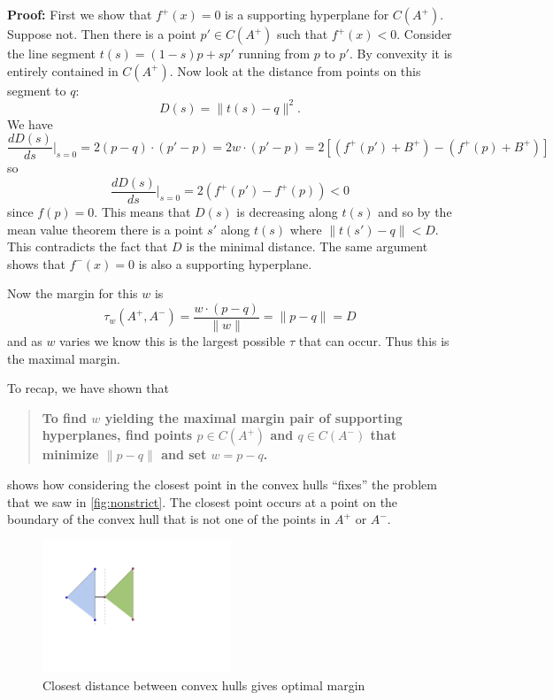 \documentclass[
]{article}
\begin{document}
\textbf{Proof:} First we show that \(f^{+}(x)=0\) is a supporting
hyperplane for \(C(A^{+})\). Suppose not. Then there is a point
\(p'\in C(A^{+})\) such that \(f^{+}(x)<0\). Consider the line segment
\(t(s) = (1-s)p+sp'\) running from \(p\) to \(p'\). By convexity it is
entirely contained in \(C(A^{+})\). Now look at the distance from points
on this segment to \(q\): \[
D(s)=\|t(s)-q\|^2.
\] We have \[
\frac{dD(s)}{ds}|_{s=0} = 2(p-q)\cdot (p'-p) = 2w\cdot (p'-p) = 2\left[(f^{+}(p')+B^{+})-(f^{+}(p)+B^{+})\right]
\] so \[
\frac{dD(s)}{ds}|_{s=0} = 2(f^{+}(p')-f^{+}(p))<0
\] since \(f(p)=0\). This means that \(D(s)\) is decreasing along
\(t(s)\) and so by the mean value theorem there is a point \(s'\) along
\(t(s)\) where \(\|t(s')-q\|<D\). This contradicts the fact that \(D\)
is the minimal distance. The same argument shows that \(f^{-}(x)=0\) is
also a supporting hyperplane.

Now the margin for this \(w\) is \[
\tau_{w}(A^{+},A^{-}) = \frac{w\cdot (p-q)}{\|w\|} = \|p-q\|=D
\] and as \(w\) varies we know this is the largest possible \(\tau\)
that can occur. Thus this is the maximal margin.

To recap, we have shown that

\begin{quote}
\textbf{To find \(w\) yielding the maximal margin pair of supporting
hyperplanes, find points \(p\in C(A^{+})\) and \(q\in C(A^{-})\) that
minimize \(\|p-q\|\) and set \(w=p-q\).}
\end{quote}

 shows how considering the closest point in the convex
hulls ``fixes'' the problem that we saw in \cref{fig:nonstrict}. The
closest point occurs at a point on the boundary of the convex hull that
is not one of the points in \(A^{+}\) or \(A^{-}\).

\begin{figure}
\hypertarget{fig:strict}{%
\centering
\includegraphics[width=0.5\textwidth,height=\textheight]{../img/convexhullwithmargin.png}
\caption{Closest distance between convex hulls gives optimal
margin}\label{fig:strict}
}
\end{figure}
\end{document}
